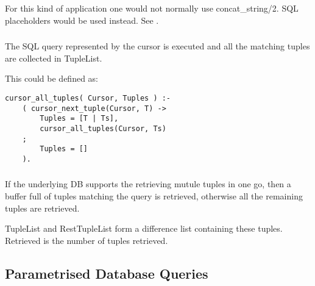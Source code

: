 For this kind of application one would not normally use
concat_string/2. SQL placeholders would be used instead. See
.


\subsubsection
{}
\label{cursor-all-tuples/2}

The SQL query represented by the cursor is executed and all
the matching tuples are collected in TupleList.

This could be defined as:

\begin{verbatim}
cursor_all_tuples( Cursor, Tuples ) :-
    ( cursor_next_tuple(Cursor, T) ->
        Tuples = [T | Ts],
        cursor_all_tuples(Cursor, Ts)
    ;
        Tuples = []
    ).
\end{verbatim}

\subsubsection
{}
\label{cursor-N-tuples/4}

If the underlying DB supports the retrieving mutule tuples in one go, then
a buffer full of tuples matching the query is retrieved, otherwise all the
remaining tuples are retrieved.

TupleList and RestTupleList form a difference list containing these
tuples. Retrieved is the number of tuples retrieved.


\subsection{Parametrised Database Queries}

